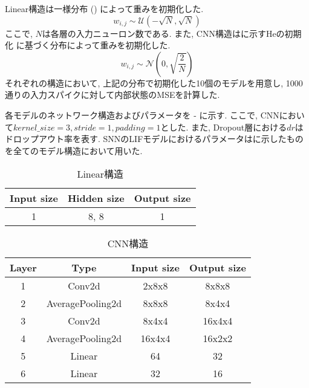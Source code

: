 Linear構造は一様分布 () によって重みを初期化した.
\begin{equation}
    w_{i,j} \sim \mathcal{U}\left(-\sqrt{N}, \sqrt{N}\right) \label{eq:uniform:distribution}
\end{equation}
ここで, $N$は各層の入力ニューロン数である.
また, CNN構造はに示すHeの初期化\cite{heinit} に基づく分布によって重みを初期化した.
\begin{equation}
    w_{i,j} \sim \mathcal{N}\left(0, \sqrt{\frac{2}{N}}\right) \label{eq:he:initialization}
\end{equation}
それぞれの構造において, 上記の分布で初期化した10個のモデルを用意し, 1000通りの入力スパイクに対して内部状態のMSEを計算した.

各モデルのネットワーク構造およびパラメータを - に示す.
ここで, CNNにおいて$kernel\_size=3, stride=1, padding=1$とした.
また, Dropout層における$dr$はドロップアウト率を表す.
SNNのLIFモデルにおけるパラメータはに示したものを全てのモデル構造において用いた.
\begin{table}[htb]
    \centering
    \caption{Linear構造}
    \label{tab:model:parameter:linear}
    \begin{tabular}{ccc}
        \hline
        \textbf{Input size}& \textbf{Hidden size} & \textbf{Output size}\\
        \hline
        1   & 8, 8 & 1 \\
        \hline
    \end{tabular}
\end{table}

\begin{table}[htb]
    \centering
    \caption{CNN構造}
    \label{tab:model:parameter:cnn}
    \begin{tabular}{cccc}
        \hline
        \textbf{Layer}& \textbf{Type}&\textbf{Input size} & \textbf{Output size}\\
        \hline
        1   & Conv2d & 2x8x8 & 8x8x8 \\
        2 & AveragePooling2d & 8x8x8 & 8x4x4 \\
        3 & Conv2d & 8x4x4 & 16x4x4 \\
        4 & AveragePooling2d & 16x4x4 & 16x2x2 \\
        5 & Linear & 64 & 32 \\
        6 & Linear & 32 & 16 \\
        \hline
    \end{tabular}
\end{table}

